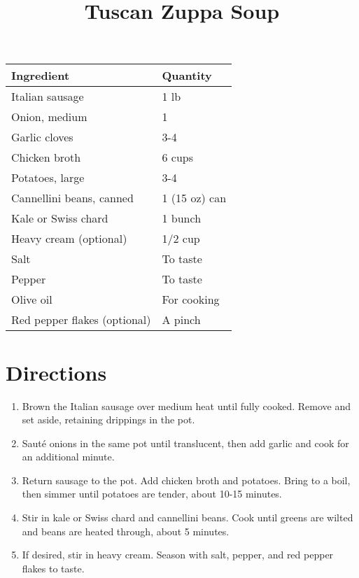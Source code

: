 \documentclass[11pt,letterpaper]{article}
\title{Tuscan Zuppa Soup}
\author{}
\date{}
\begin{document}
\maketitle

\begin{table}[h]
  \centering
  \setlength{\tabcolsep}{1em}
  \renewcommand{\arraystretch}{1.4}
  \begin{tabular}{|l|l|}
    \hline
    \textbf{Ingredient} & \textbf{Quantity} \\
    \hline
    Italian sausage & 1 lb \\
    Onion, medium & 1 \\
    Garlic cloves & 3-4 \\
    Chicken broth & 6 cups \\
    Potatoes, large & 3-4 \\
    Cannellini beans, canned & 1 (15 oz) can \\
    Kale or Swiss chard & 1 bunch \\
    Heavy cream (optional) & 1/2 cup \\
    Salt & To taste \\
    Pepper & To taste \\
    Olive oil & For cooking \\
    Red pepper flakes (optional) & A pinch \\
    \hline
  \end{tabular}
\end{table}

\section*{Directions}
\begin{enumerate}
    \item Brown the Italian sausage over medium heat until fully cooked. Remove and set aside, retaining drippings in the pot.
    \item Sauté onions in the same pot until translucent, then add garlic and cook for an additional minute.
    \item Return sausage to the pot. Add chicken broth and potatoes. Bring to a boil, then simmer until potatoes are tender, about 10-15 minutes.
    \item Stir in kale or Swiss chard and cannellini beans. Cook until greens are wilted and beans are heated through, about 5 minutes.
    \item If desired, stir in heavy cream. Season with salt, pepper, and red pepper flakes to taste.
\end{enumerate}
\end{document}

